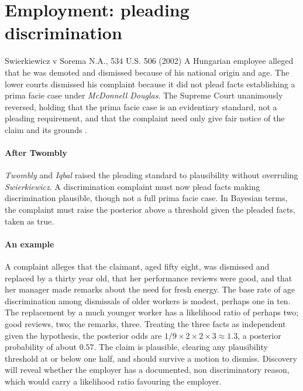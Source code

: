 \section{Employment: pleading discrimination}

\begin{casebox}{Swierkiewicz v Sorema N.A., 534 U.S. 506 (2002)}
A Hungarian employee alleged that he was demoted and dismissed because of his national origin and age. The lower courts dismissed his complaint because it did not plead facts establishing a prima facie case under \emph{McDonnell Douglas}. The Supreme Court unanimously reversed, holding that the prima facie case is an evidentiary standard, not a pleading requirement, and that the complaint need only give fair notice of the claim and its grounds \citep{swierkiewicz2002}.
\end{casebox}

\paragraph{After Twombly} \emph{Twombly} \citep{twombly2007} and \emph{Iqbal} \citep{iqbal2009} raised the pleading standard to plausibility without overruling \emph{Swierkiewicz}. A discrimination complaint must now plead facts making discrimination plausible, though not a full prima facie case. In Bayesian terms, the complaint must raise the posterior above a threshold given the pleaded facts, taken as true.

\paragraph{An example} A complaint alleges that the claimant, aged fifty eight, was dismissed and replaced by a thirty year old, that her performance reviews were good, and that her manager made remarks about the need for fresh energy. The base rate of age discrimination among dismissals of older workers is modest, perhaps one in ten. The replacement by a much younger worker has a likelihood ratio of perhaps two; good reviews, two; the remarks, three. Treating the three facts as independent given the hypothesis, the posterior odds are $1/9\times 2\times 2\times 3 \approx 1.3$, a posterior probability of about $0.57$. The claim is plausible, clearing any plausibility threshold at or below one half, and should survive a motion to dismiss. Discovery will reveal whether the employer has a documented, non discriminatory reason, which would carry a likelihood ratio favouring the employer.

